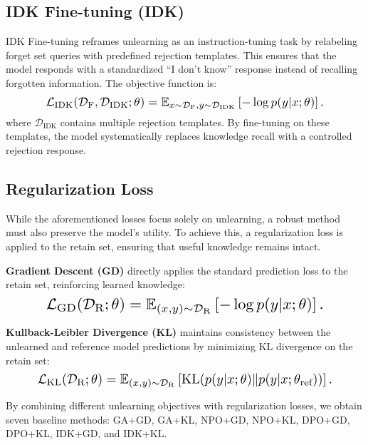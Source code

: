 \subsection{IDK Fine-tuning (IDK)}
IDK Fine-tuning reframes unlearning as an instruction-tuning task by relabeling forget set queries with predefined rejection templates. This ensures that the model responds with a standardized “I don’t know” response instead of recalling forgotten information. The objective function is:
\begin{equation}\label{eq:IDK}
\resizebox{0.81\hsize}{!}{$
\mathcal{L}_{\text{IDK}}(\mathcal{D}_{\text{F}},\mathcal{D}_{\text{IDK}};\theta) 
= \mathbb{E}_{x \sim \mathcal{D}_{\text{F}}, y \sim \mathcal{D}_{\text{IDK}}}  \left[ -\log p(y|x; \theta) \right].$}
\end{equation}
where $\mathcal{D}_{\text{IDK}}$ contains multiple rejection templates. By fine-tuning on these templates, the model systematically replaces knowledge recall with a controlled rejection response.
\subsection{Regularization Loss}
While the aforementioned losses focus solely on unlearning, a robust method must also preserve the model’s utility. To achieve this, a regularization loss is applied to the retain set, ensuring that useful knowledge remains intact.

\textbf{Gradient Descent (GD)} directly applies the standard prediction loss to the retain set, reinforcing learned knowledge:
\begin{equation}\label{eq:GD}
\resizebox{0.81\hsize}{!}{$
\mathcal{L}_{\text{GD}}(\mathcal{D}_{\text{R}};\theta) = \mathbb{E}_{{(x,y) \sim \mathcal{D}_{\text{R}}}} \left[ -\log p(y|x; \theta) \right].$}
\end{equation}

\textbf{Kullback-Leibler Divergence (KL)} maintains consistency between the unlearned and reference model predictions by minimizing KL divergence on the retain set:
\begin{equation}\label{eq:KL}
\resizebox{0.86\hsize}{!}{$
\mathcal{L}_{\text{KL}}(\mathcal{D}_{\text{R}};\theta) = \mathbb{E}_{(x,y) \sim \mathcal{D}_{\text{R}}} \left[\text{KL}(p(y|x; \theta) \Vert p(y|x; \theta_{\text{ref}}))\right].$}
\end{equation}

By combining different unlearning objectives with regularization losses, we obtain seven baseline methods: GA+GD, GA+KL, NPO+GD, NPO+KL, DPO+GD, DPO+KL, IDK+GD, and IDK+KL.

